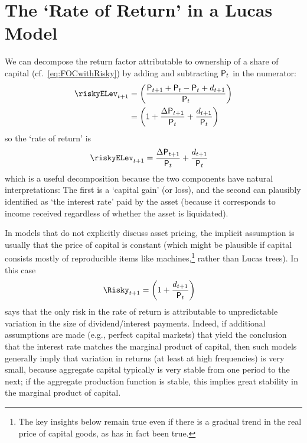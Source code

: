 \documentclass{\handout}
\begin{document}
\hypertarget{the-rate-of-return-in-a-lucas-model}{}
\section{The `Rate of Return' in a Lucas Model}
We can decompose the return factor attributable to ownership of a share of capital (cf.\ \eqref{eq:FOCwithRisky}) by adding and subtracting $\mathsf{P}_{t}$ in the numerator:
\begin{equation}\begin{gathered}\begin{aligned}
  \riskyELev_{t+1} & =  \left(\frac{{\Price}_{t+1}+{\Price}_{t}-{\Price}_{t}+\dvdnd_{t+1}}{\Price_{t}}\right) \notag
\\        & =  \left(1+\frac{\Delta {\Price}_{t+1}}{\Price_{t}}+\frac{\dvdnd_{t+1}}{\Price_{t}}\right) \label{eq:RiskyDecompose}
\end{aligned}\end{gathered}\end{equation}
so the `rate of return' is 
\begin{equation}\begin{gathered}\begin{aligned}
 \riskyELev_{t+1}    & =  \frac{\Delta {\Price}_{t+1}}{\Price_{t}}+\frac{\dvdnd_{t+1}}{\Price_{t}} \label{eq:riskyDecompose}
\end{aligned}\end{gathered}\end{equation}
which is a useful decomposition because the two components 
have natural interpretations: The first is a `capital gain' (or loss),
and the second can plausibly identified as `the interest rate' paid
by the asset (because it corresponds to income received regardless of whether the asset
is liquidated).

In models that do not explicitly discuss asset pricing, the
implicit assumption is usually that the price of capital is constant
(which might be plausible if capital consists mostly of reproducible items
like machines,\footnote{The key insights below remain true even if there is a gradual trend in the real price of capital goods, as has in fact been true.} rather than Lucas trees).  In this case
\begin{equation*}\begin{gathered}\begin{aligned}
  \Risky_{t+1} & =  \left(1+\frac{\dvdnd_{t+1}}{\Price_{t}}\right)
\end{aligned}\end{gathered}\end{equation*}
says that the only risk in the rate of return is attributable to unpredictable variation in the size of 
dividend/interest payments.  Indeed, if additional assumptions are made (e.g., perfect capital markets) that yield the conclusion that the interest rate matches the marginal product of capital, then such models generally imply that variation in returns (at least at high frequencies) is very small, because aggregate capital typically is very stable from one period to the next; if the aggregate production function is stable, this implies great stability in the marginal product of capital.
\end{document}
